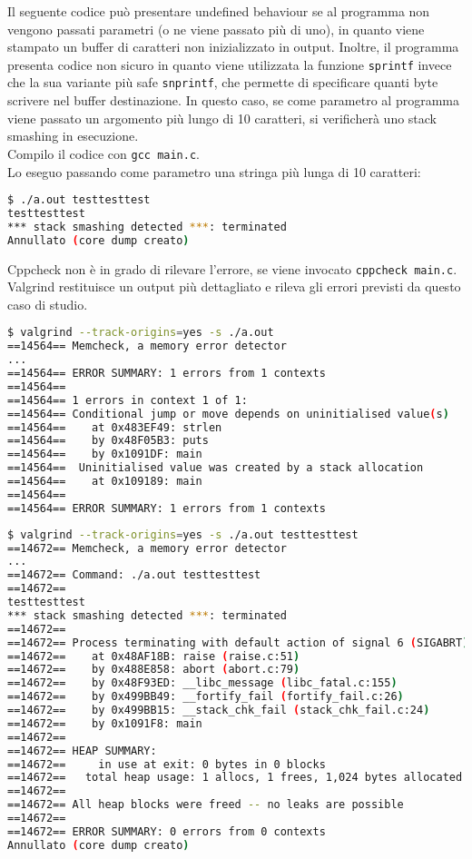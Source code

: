 \documentclass{article}
\begin{document}
Il seguente codice può presentare undefined behaviour se al programma non
vengono passati parametri (o ne viene passato più di uno), in quanto viene
stampato un buffer di caratteri non inizializzato in output. Inoltre, il
programma presenta codice non sicuro in quanto viene utilizzata la funzione
\texttt{sprintf} invece che la sua variante più safe \texttt{snprintf}, che
permette di specificare quanti byte scrivere nel buffer destinazione. In questo
caso, se come parametro al programma viene passato un argomento più lungo di 10
caratteri, si verificherà uno stack smashing in esecuzione. \\

Compilo il codice con \texttt{gcc main.c}. \\

Lo eseguo passando come parametro una stringa più lunga di 10 caratteri:

\begin{lstlisting}[language=bash]
$ ./a.out testtesttest
testtesttest
*** stack smashing detected ***: terminated
Annullato (core dump creato)
\end{lstlisting}

Cppcheck non è in grado di rilevare l'errore, se viene invocato \texttt{cppcheck
main.c}. \\

Valgrind restituisce un output più dettagliato e rileva gli errori previsti da
questo caso di studio.

\begin{lstlisting}[language=bash]
$ valgrind --track-origins=yes -s ./a.out 
==14564== Memcheck, a memory error detector
...
==14564== ERROR SUMMARY: 1 errors from 1 contexts 
==14564== 
==14564== 1 errors in context 1 of 1:
==14564== Conditional jump or move depends on uninitialised value(s)
==14564==    at 0x483EF49: strlen
==14564==    by 0x48F05B3: puts
==14564==    by 0x1091DF: main
==14564==  Uninitialised value was created by a stack allocation
==14564==    at 0x109189: main
==14564== 
==14564== ERROR SUMMARY: 1 errors from 1 contexts 
\end{lstlisting}

\begin{lstlisting}[language=bash]
$ valgrind --track-origins=yes -s ./a.out testtesttest
==14672== Memcheck, a memory error detector
...
==14672== Command: ./a.out testtesttest
==14672== 
testtesttest
*** stack smashing detected ***: terminated
==14672== 
==14672== Process terminating with default action of signal 6 (SIGABRT)
==14672==    at 0x48AF18B: raise (raise.c:51)
==14672==    by 0x488E858: abort (abort.c:79)
==14672==    by 0x48F93ED: __libc_message (libc_fatal.c:155)
==14672==    by 0x499BB49: __fortify_fail (fortify_fail.c:26)
==14672==    by 0x499BB15: __stack_chk_fail (stack_chk_fail.c:24)
==14672==    by 0x1091F8: main
==14672== 
==14672== HEAP SUMMARY:
==14672==     in use at exit: 0 bytes in 0 blocks
==14672==   total heap usage: 1 allocs, 1 frees, 1,024 bytes allocated
==14672== 
==14672== All heap blocks were freed -- no leaks are possible
==14672== 
==14672== ERROR SUMMARY: 0 errors from 0 contexts 
Annullato (core dump creato)
\end{lstlisting}
\end{document}
